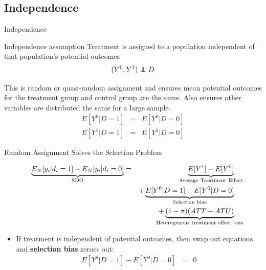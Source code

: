 \documentclass{beamer}
\newcommand\independent{\protect\mathpalette{\protect\independenT}{\perp}}
\def\independenT#1#2{\mathrel{\rlap{$#1#2$}\mkern2mu{#1#2}}}
\begin{document}
\subsection{Independence}


\begin{frame}{Independence}


  \begin{block}{Independence assumption}
    Treatment is assigned to a population independent of that population's potential outcomes  $$(Y^0,Y^1)\independent{D}$$
  \end{block}
  This is random or quasi-random assignment and ensures mean potential outcomes for the treatment group and control group are the same.  Also ensures other variables are distributed the same for a large sample.
  \begin{eqnarray*}
    E[Y^0|D=1] &=& E[Y^0 | D=0] \\
    E[Y^1|D=1] &=& E[Y^1 | D=0]
  \end{eqnarray*}
\end{frame}

\begin{frame}{Random Assignment Solves the Selection Problem}

  \begin{eqnarray*}
    \underbrace{E_N[y_i | d_i=1] - E_N[y_i | d_i=0]}_{ \mathclap{\text{SDO}}}&=& \underbrace{E[Y^1] - E[Y^0]}_{ \mathclap{\text{Average Treatment Effect}}} \\
    &&+ \underbrace{E[Y^0|D=1] - E[Y^0 | D=0]}_{ \mathclap{\text{Selection bias}}}  \\
    && + \underbrace{(1-\pi)(ATT - ATU)}_{ \mathclap{\text{Heterogenous treatment effect bias}}}
  \end{eqnarray*}


  \begin{itemize}
    \item If treatment is independent of potential outcomes, then swap out equations and \textbf{selection bias} zeroes out:
          \begin{eqnarray*}
            E[Y^0 | D=1] - E[Y^0 | D=0] &=& 0
          \end{eqnarray*}
  \end{itemize}

\end{frame}
\end{document}
